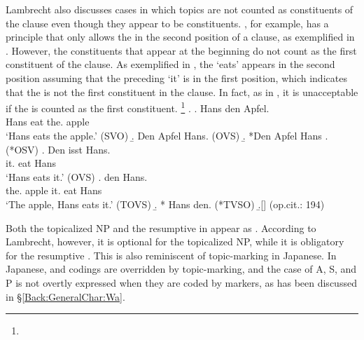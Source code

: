 Lambrecht also discusses cases in which
topics are not counted as constituents of the clause
even though they appear to be constituents.
, for example, has a principle that only allows the  in the second position of a clause, as exemplified in \Next[a-d].
However, the  constituents that appear at the beginning do not count as the first constituent of the clause.
As exemplified in \Next[e],
the   `eats' appears in the second position assuming that the preceding  `it' is in the first position,
which indicates that
the   is not the first constituent in the clause.
In fact, as in \Next[f],
it is unacceptable
if the   is counted as the first constituent.%
 \footnote{
 }
%
\ex.\label{Par:Subj:Ex:Ex:Apfel}
 \ag. Hans  den Apfel. \\
   Hans eat the. apple \\
   `Hans eats the apple.' \hfill{(SVO)}
 \b. Den Apfel  Hans. \hfill{(OVS)}
 \b. *Den Apfel Hans .\hfill{(*OSV)}
 \bg. Den isst Hans. \\
   it. eat Hans \\
   `Hans eats it.' \hfill{(OVS)}
 \bg.   den  Hans. \\
   the. apple it. eat Hans \\
   `The apple, Hans eats it.'  \hfill{(TOVS)}
 \b. *   Hans den. \hfill{(*TVSO)}
 \b.[] \hfill{(op.cit.: 194)}

Both the topicalized NP  and the resumptive   in \Last[e] appear as .
According to Lambrecht, however,
it is optional for the topicalized NP,
while it is obligatory for the resumptive .
This is also reminiscent of topic-marking in Japanese.
In Japanese,
 and  codings are overridden by topic-marking,
and the case of A, S, and P is not overtly expressed when they are coded by  markers,
as has been discussed in \S \ref{Back:GeneralChar:Wa}.


